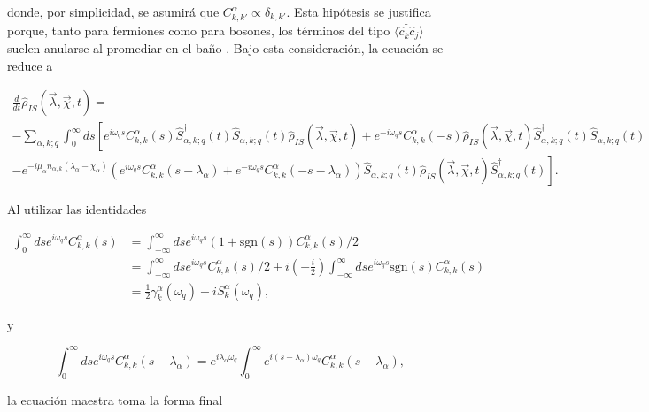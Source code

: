 \begin{appendixs}
donde, por simplicidad, se asumirá que $C_{k,k'}^{\alpha} \propto \delta_{k,k'}$. Esta hipótesis se justifica porque, tanto para fermiones como para bosones, los términos del tipo $\langle \hat{c}^{\dagger}_{k}\hat{c}_{j}\rangle$ suelen anularse al promediar en el baño \cite{potts2021thermodynamically}. Bajo esta consideración, la ecuación se reduce a

\begin{multline*}
    \frac{d}{dt}\hat{\rho}_{IS}(\vec{\lambda},\vec{\chi},t) = \\
     - \sum_{\alpha,k;q} \int_{0}^{\infty}ds \left[e^{i\omega_{q}s}C^{\alpha}_{k,k}(s) \hat{S}^{\dagger}_{\alpha,k;q}(t)\hat{S}_{\alpha,k;q}(t)\hat{\rho}_{IS}(\vec{\lambda},\vec{\chi},t)  +  e^{-i\omega_{q}s}C^{\alpha}_{k,k}(-s) \hat{\rho}_{IS}(\vec{\lambda},\vec{\chi},t) \hat{S}^{\dagger}_{\alpha,k;q}(t) \hat{S}_{\alpha,k;q}(t) \right. \\
    \left. - e^{-i\mu_{\alpha}n_{\alpha,k}(\lambda_{\alpha}-\chi_{\alpha})}(e^{i\omega_{q}s}C^{\alpha}_{k,k}(s-\lambda_{\alpha}) + e^{-i\omega_{q}s}C^{\alpha}_{k,k}(-s-\lambda_{\alpha}) ) \hat{S}_{\alpha,k;q}(t) \hat{\rho}_{IS}(\vec{\lambda},\vec{\chi},t) \hat{S}^{\dagger}_{\alpha,k;q}(t)    \right].  
\end{multline*}

Al utilizar las identidades

\begin{align*}
    \int_{0}^{\infty}ds e^{i\omega_{q}s}C^{\alpha}_{k,k}(s) & = \int_{-\infty}^{\infty}ds e^{i\omega_{q}s}(1+\text{sgn}(s))C^{\alpha}_{k,k}(s)/2 \\
    & = \int_{-\infty}^{\infty}ds e^{i\omega_{q}s}C^{\alpha}_{k,k}(s)/2 + i \left(-\frac{i}{2} \right) \int_{-\infty}^{\infty}ds e^{i\omega_{q}s} \text{sgn}(s)C^{\alpha}_{k,k}(s) \\
    & = \frac{1}{2}\gamma_{k}^{\alpha}(\omega_{q}) + i S^{\alpha}_{k}(\omega_{q}),
\end{align*}

y 

\begin{equation*}
    \int_{0}^{\infty}dse^{i\omega_{q}s}C^{\alpha}_{k,k}(s-\lambda_{\alpha}) = e^{i\lambda_{\alpha}\omega_{q}}\int_{0}^{\infty}e^{i(s-\lambda_{\alpha})\omega_{q}}C^{\alpha}_{k,k}(s-\lambda_{\alpha}), 
\end{equation*}

la ecuación maestra toma la forma final


\end{appendixs}
